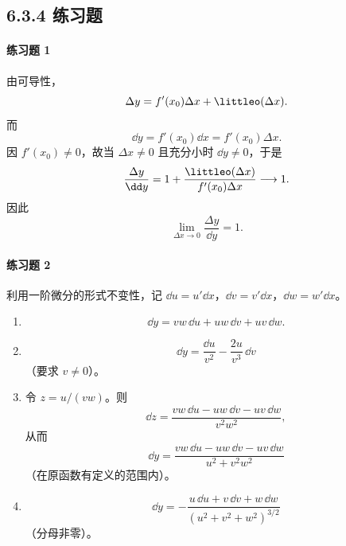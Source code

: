 \subsection*{6.3.4 练习题}

\paragraph{练习题 1}
\begin{xsolution}
由可导性，
\[
  \Delta y=f'(x_0)\Delta x+\littleo(\Delta x).
\]
而
\[
  \dd y=f'(x_0)\dd x=f'(x_0)\Delta x.
\]
因 $f'(x_0)\ne0$，故当 $\Delta x\ne0$ 且充分小时 $\dd y\ne0$，于是
\[
  \frac{\Delta y}{\dd y}
  =1+\frac{\littleo(\Delta x)}{f'(x_0)\Delta x}
  \longrightarrow1.
\]
因此
\[
  \boxed{\lim_{\Delta x\to0}\frac{\Delta y}{\dd y}=1}.
\]
\end{xsolution}

\paragraph{练习题 2}
\begin{xsolution}
利用一阶微分的形式不变性，记 $\dd u=u'\dd x$，$\dd v=v'\dd x$，$\dd w=w'\dd x$。
\begin{enumerate}[label=(\arabic*)]
  \item
  \[
    \boxed{\dd y=vw\,\dd u+uw\,\dd v+uv\,\dd w}.
  \]
  \item
  \[
    \boxed{\dd y=\frac{\dd u}{v^2}-\frac{2u}{v^3}\,\dd v}
  \]
  （要求 $v\ne0$）。
  \item 令 $z=u/(vw)$。则
  \[
    \dd z=\frac{vw\,\dd u-uw\,\dd v-uv\,\dd w}{v^2w^2},
  \]
  从而
  \[
    \boxed{\dd y=
    \frac{vw\,\dd u-uw\,\dd v-uv\,\dd w}{u^2+v^2w^2}}
  \]
  （在原函数有定义的范围内）。
  \item
  \[
    \boxed{\dd y=-\frac{u\,\dd u+v\,\dd v+w\,\dd w}{(u^2+v^2+w^2)^{3/2}}}
  \]
  （分母非零）。
\end{enumerate}
\end{xsolution}

